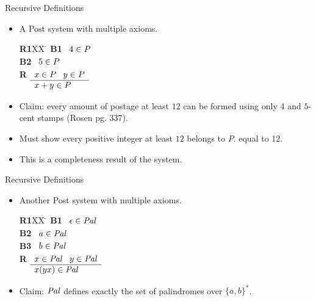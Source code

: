 \begin{wideslide}[bm=,toc=]{Recursive Definitions}
\begin{itemize}
\item A Post system with multiple axioms.
\begin{tabbing}
{\bf R1}XX \=  \kill
{\bf B1} \>
        \(\begin{array}[t]{l}
        4\in P
        \end{array}\) \\[2ex]
{\bf B2} \>
        \(\begin{array}[t]{l}
        5\in P
        \end{array}\) \\[2ex]
        
{\bf R} \>
        \(\begin{array}[t]{l}
        x \in P \;\;\;y \in P \\
        \hline
        x + y \in P
        \end{array}\)
\end{tabbing}
\item Claim: every amount of postage at least $12$ can be formed using only $4$
and $5$-cent stamps (Rosen pg. 337).
\item Must show every positive integer at least $12$ belongs to $P$. 
equal to 12.
\item This is a completeness result of the system.
\end{itemize}
\end{wideslide}

\begin{wideslide}[bm=,toc=]{Recursive Definitions}
\begin{itemize}
\item  Another Post system with multiple axioms.
\begin{tabbing}
{\bf R1}XX \=  \kill
{\bf B1} \>
        \(\begin{array}[t]{l}
        \epsilon \in \mbox{\it Pal\/}
        \end{array}\) \\[2ex]
{\bf B2} \>
        \(\begin{array}[t]{l}
        a\in \mbox{\it Pal\/}
        \end{array}\) \\[2ex]

 {\bf B3} \>
        \(\begin{array}[t]{l}
        b\in \mbox{\it Pal\/}
        \end{array}\) \\[2ex]
        
{\bf R} \>
        \(\begin{array}[t]{l}
        x \in \mbox{\it Pal\/} \;\;\;y \in \mbox{\it Pal\/} \\
        \hline
        x(yx) \in \mbox{\it Pal\/}
        \end{array}\)
\end{tabbing}
\item Claim:  $\mbox{\it Pal\/}$ defines exactly the set of palindromes over $\{a,b\}^*$.
\end{itemize}
\end{wideslide}

